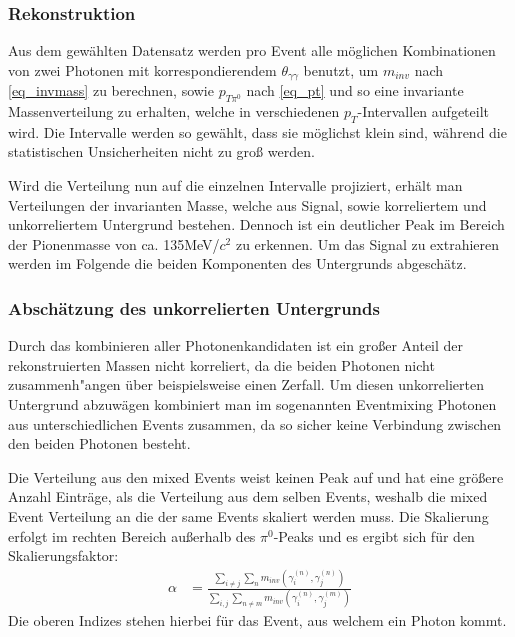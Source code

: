 \documentclass[]{article}
\begin{document}
	
	\subsubsection{Rekonstruktion}
	Aus dem gew{\"a}hlten Datensatz werden pro Event alle m{\"o}glichen Kombinationen von zwei Photonen mit korrespondierendem $\theta_{\gamma\gamma}$ benutzt, um $m_{inv}$ nach \ref{eq_invmass} zu berechnen, sowie $p_{T\pi^{0}}$ nach \ref{eq_pt} und so eine invariante Massenverteilung zu erhalten, welche in verschiedenen $p_{T}$-Intervallen aufgeteilt wird. Die Intervalle werden so gew{\"a}hlt, dass sie m{\"o}glichst klein sind, w{\"a}hrend die statistischen Unsicherheiten nicht zu gro{\ss} werden.
	
	
	Wird die Verteilung nun auf die einzelnen Intervalle projiziert, erh{\"a}lt man Verteilungen der invarianten Masse, welche aus Signal, sowie korreliertem und unkorreliertem Untergrund bestehen. Dennoch ist ein deutlicher Peak im Bereich der Pionenmasse von ca. 135MeV/$c^{2}$ zu erkennen. Um das Signal zu extrahieren werden im Folgende die beiden Komponenten des Untergrunds abgesch{\"a}tz.
	
	\subsubsection{Absch{\"a}tzung des unkorrelierten Untergrunds}
	
	Durch das kombinieren aller Photonenkandidaten ist ein gro{\ss}er Anteil der rekonstruierten Massen nicht korreliert, da die beiden Photonen nicht zusammenh{"a}ngen {\"u}ber beispielsweise einen Zerfall. Um diesen unkorrelierten Untergrund abzuw{\"a}gen kombiniert man im sogenannten Eventmixing Photonen aus unterschiedlichen Events zusammen, da so sicher keine Verbindung zwischen den beiden Photonen besteht.
	
	
	Die Verteilung aus den mixed Events weist keinen Peak auf und hat eine gr{\"o}{\ss}ere Anzahl Eintr{\"a}ge, als die Verteilung aus dem selben Events, weshalb die mixed Event Verteilung an die der same Events skaliert werden muss. Die Skalierung erfolgt im rechten Bereich au{\ss}erhalb des $\pi^{0}$-Peaks und es ergibt sich f{\"u}r den Skalierungsfaktor:
	\begin{align}
	\alpha &= \frac{\sum_{i \neq j}\sum_{n}m_{inv}\left( \gamma^{(n)}_{i},\gamma^{(n)}_{j}\right) }{\sum_{i,j}\sum_{n \neq m}m_{inv}\left( \gamma^{(n)}_{i},\gamma^{(m)}_{j}\right) }
	\end{align}
	Die oberen Indizes stehen hierbei f{\"u}r das Event, aus welchem ein Photon kommt. 
\end{document}
